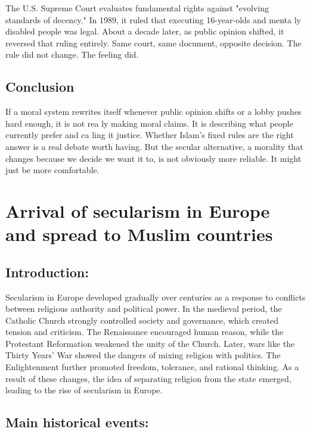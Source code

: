\documentclass[12pt]{article}
\begin{document}
The U.S. Supreme Court evaluates fundamental rights against "evolving standards of decency." 
In 1989, it ruled that executing 16-year-olds and menta ly disabled people was legal. About a 
decade later, as public opinion shifted, it reversed that ruling entirely. Same court, same 
document, opposite decision. The rule did not change. The feeling did. 

\subsection*{Conclusion}

If a moral system rewrites itself whenever public opinion shifts or a lobby pushes hard enough, 
it is not rea ly making moral claims. It is describing what people currently prefer and ca ling it 
justice. Whether Islam's fixed rules are the right answer is a real debate worth having. But the 
secular alternative, a morality that changes because we decide we want it to, is not obviously 
more reliable. It might just be more comfortable. 

\newpage
\pagestyle{fancy}
\fancyhf{}
\fancyfoot[C]{\thepage}

\section*{Arrival of secularism in Europe and spread to Muslim countries}

\subsection*{Introduction:}

Secularism in Europe developed gradually over centuries as a response to conflicts between religious authority and political power. In the medieval period, the Catholic Church strongly controlled society and governance, which created tension and criticism. The Renaissance encouraged human reason, while the Protestant Reformation weakened the unity of the Church. Later, wars like the Thirty Years’ War showed the dangers of mixing religion with politics. The Enlightenment further promoted freedom, tolerance, and rational thinking. As a result of these changes, the idea of separating religion from the state emerged, leading to the rise of secularism in Europe.

\subsection*{Main historical events:}
\end{document}
